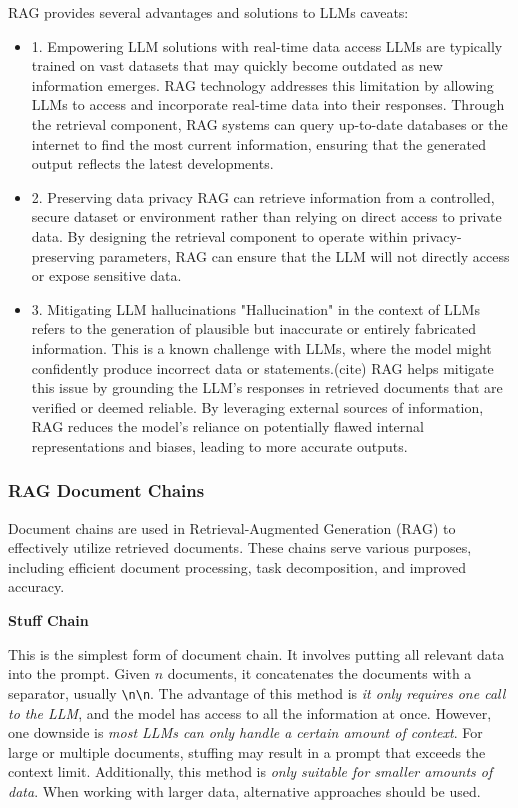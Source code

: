\documentclass{scrartcl}
\begin{document}
RAG provides several advantages and solutions to LLMs caveats:
\begin{itemize}
	\item 1. Empowering LLM solutions with real-time data access
	LLMs are typically trained on vast datasets that may quickly become outdated as new information emerges. RAG technology addresses this limitation by allowing LLMs to access and incorporate real-time data into their responses. Through the retrieval component, RAG systems can query up-to-date databases or the internet to find the most current information, ensuring that the generated output reflects the latest developments. 
	\item 2. Preserving data privacy
	RAG can retrieve information from a controlled, secure dataset or environment rather than relying on direct access to private data. By designing the retrieval component to operate within privacy-preserving parameters, RAG can ensure that the LLM will not directly access or expose sensitive data. 
	\item 3. Mitigating LLM hallucinations
	"Hallucination" in the context of LLMs refers to the generation of plausible but inaccurate or entirely fabricated information. This is a known challenge with LLMs, where the model might confidently produce incorrect data or statements.(cite) RAG helps mitigate this issue by grounding the LLM's responses in retrieved documents that are verified or deemed reliable. By leveraging external sources of information, RAG reduces the model's reliance on potentially flawed internal representations and biases, leading to more accurate outputs.
\end{itemize}

\subsubsection{RAG Document Chains}

Document chains are used in Retrieval-Augmented Generation (RAG) to effectively utilize retrieved documents. These chains serve various purposes, including efficient document processing, task decomposition, and improved accuracy.

\textbf{Stuff Chain}

This is the simplest form of document chain. It involves putting all relevant data into the prompt. Given \(n\) documents, it concatenates the documents with a separator, usually \verb|\n\n|.
The advantage of this method is \textit{it only requires one call to the LLM}, and the model has access to all the information at once.
However, one downside is \textit{most LLMs can only handle a certain amount of context}. For large or multiple documents, stuffing may result in a prompt that exceeds the context limit.
Additionally, this method is \textit{only suitable for smaller amounts of data}. When working with larger data, alternative approaches should be used.
\end{document}
